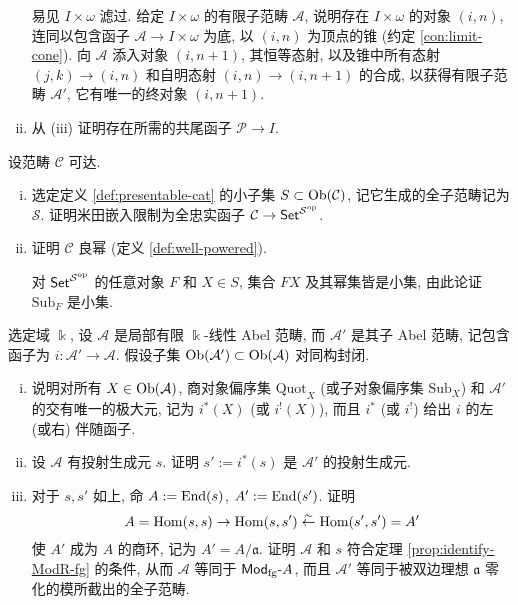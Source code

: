 \begin{Exercises}
\begin{enumerate}[(i)]
		\begin{hint}
			易见 $I \times \omega$ 滤过. 给定 $I \times \omega$ 的有限子范畴 $\mathcal{A}$, 说明存在 $I \times \omega$ 的对象 $(i, n)$, 连同以包含函子 $\mathcal{A} \to I \times \omega$ 为底, 以 $(i, n)$ 为顶点的锥 (约定 \ref{con:limit-cone}). 向 $\mathcal{A}$ 添入对象 $(i, n+1)$, 其恒等态射, 以及锥中所有态射 $(j, k) \to (i, n)$ 和自明态射 $(i, n) \to (i, n+1)$ 的合成, 以获得有限子范畴 $\mathcal{A}'$, 它有唯一的终对象 $(i, n+1)$.
		\end{hint}
	
		\item 从 (iii) 证明存在所需的共尾函子 $\mathcal{P} \to I$.
	\end{enumerate}
	
	\item 设范畴 $\mathcal{C}$ 可达.
	\begin{enumerate}[(i)]
		\item 选定定义 \ref{def:presentable-cat} 的小子集 $S \subset \operatorname{Ob}(\mathcal{C})$, 记它生成的全子范畴记为 $\mathcal{S}$. 证明米田嵌入限制为全忠实函子 $\mathcal{C} \to \mathsf{Set}^{\mathcal{S}^{\operatorname{op}}}$.
		\item 证明 $\mathcal{C}$ 良幂 (定义 \ref{def:well-powered}).
		\begin{hint}
			对 $\mathsf{Set}^{\mathcal{S}^{\operatorname{op}}}$ 的任意对象 $F$ 和 $X \in S$, 集合 $FX$ 及其幂集皆是小集, 由此论证 $\mathrm{Sub}_F$ 是小集.
		\end{hint}
	\end{enumerate}

	\item 选定域 $\Bbbk$, 设 $\mathcal{A}$ 是局部有限 $\Bbbk$-线性 Abel 范畴, 而 $\mathcal{A}'$ 是其子 Abel 范畴, 记包含函子为 $i: \mathcal{A}' \to \mathcal{A}$. 假设子集 $\operatorname{Ob}(\mathcal{A}') \subset \operatorname{Ob}(\mathcal{A})$ 对同构封闭.
	\begin{enumerate}[(i)]
		\item 说明对所有 $X \in \operatorname{Ob}(\mathcal{A})$, 商对象偏序集 $\mathrm{Quot}_X$ (或子对象偏序集 $\mathrm{Sub}_X$) 和 $\mathcal{A}'$ 的交有唯一的极大元, 记为 $i^*(X)$ (或 $i^!(X)$), 而且 $i^*$ (或 $i^!$) 给出 $i$ 的左 (或右) 伴随函子.
		\item 设 $\mathcal{A}$ 有投射生成元 $s$. 证明 $s' := i^*(s)$ 是 $\mathcal{A}'$ 的投射生成元.
		\item 对于 $s, s'$ 如上, 命 $A := \operatorname{End}(s)$, $A' := \operatorname{End}(s')$. 证明
		\[ A = \operatorname{Hom}(s, s) \to \operatorname{Hom}(s, s') \stackrel{\sim}{\leftarrow} \operatorname{Hom}(s', s') = A' \]
		使 $A'$ 成为 $A$ 的商环, 记为 $A' = A/\mathfrak{a}$. 证明 $\mathcal{A}$ 和 $s$ 符合定理 \ref{prop:identify-ModR-fg} 的条件, 从而 $\mathcal{A}$ 等同于 $\mathsf{Mod}_{\mathrm{fg}}\text{-}A$, 而且 $\mathcal{A}'$ 等同于被双边理想 $\mathfrak{a}$ 零化的模所截出的全子范畴.
	\end{enumerate}
\end{Exercises}